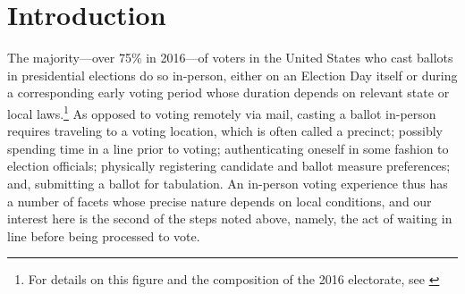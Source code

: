 \documentclass[12pt,titlepage]{article}
\begin{document}
\begin{abstract}
  \noindent 
  Lines can constitute meaningful, albeit unfortunate, aspects of
  individuals' voting experiences. The causes and consequences of
  lines are the subject of ongoing research in the field of election
  administration, and we use early voter check-in times from Florida
  in the General Elections of 2012 and 2016 to study the times at
  which voters cast their ballots and to estimate the effect of
  waiting in line on future turnout.  Our check-in times---involving
  942,194 early in-person voters from 2012 and 1,687,304 from
  2016---highlight the disproportionately problematic experiences
  faced by minority voters, although we find many fewer such problems
  in 2016 compared to 2012.  Moreover, we estimate that Florida early
  in-person voters who waited excessively in 2012 had a very slightly
  lower probability of voting in 2016, \emph{ceteris paribus}.  Our
  results draw attention to the continued importance of voting lines
  and the potential effect they have on future political activity.
\end{abstract}

%

\newpage
\section*{Introduction}

The majority---over 75\% in 2016---of voters in the United States who
cast ballots in presidential elections do so in-person, either on an
Election Day itself or during a corresponding early voting period
whose duration depends on relevant state or local laws.\footnote{For
  details on this figure and the composition of the 2016 electorate,
  see \citet{eac:2016}} As opposed to voting remotely via mail,
casting a ballot in-person requires traveling to a voting location,
which is often called a precinct; possibly spending time in a line
prior to voting; authenticating oneself in some fashion to election
officials; physically registering candidate and ballot measure
preferences; and, submitting a ballot for tabulation.  An in-person
voting experience thus has a number of facets whose precise nature
depends on local conditions, and our interest here is the second of
the steps noted above, namely, the act of waiting in line before being
processed to vote.
\end{document}
